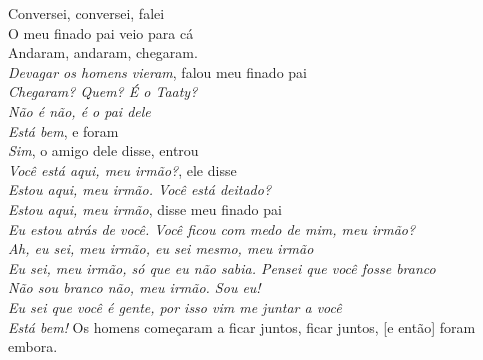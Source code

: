 \begin{linenumbers}\begingroup\raggedright
 
\noindent   Conversei, conversei, falei\\
  O meu finado pai veio para cá\\
  Andaram, andaram, chegaram.\\
  \emph{Devagar os homens vieram}, falou meu finado pai\\
  \emph{Chegaram? Quem? É o Taaty?}\\
  \emph{Não é não, é o pai dele}\\
  \emph{Está bem}, e foram\\
  \emph{Sim}, o amigo dele disse, entrou\\
  \emph{Você está aqui, meu irmão?}, ele disse\\
  \emph{Estou aqui, meu irmão. Você está deitado?}\\
  \emph{Estou aqui, meu irmão}, disse meu finado pai\\
  \emph{Eu estou atrás de você. Você ficou com medo de mim, meu irmão?}\\
  \emph{Ah, eu sei, meu irmão, eu sei mesmo, meu irmão}\\
  \emph{Eu sei, meu irmão, só que eu não sabia. Pensei que você fosse branco}\\
  \emph{Não sou branco não, meu irmão. Sou eu!}\\
  \emph{Eu sei que você é gente, por isso vim me juntar a você}\\
  \emph{Está bem!} Os homens começaram a ficar juntos, ficar juntos, {[}e então{]} foram embora.
 
\end{linenumbers}\endgroup

